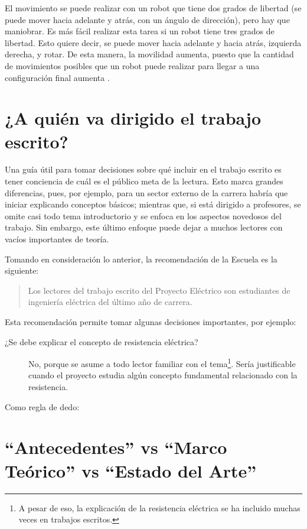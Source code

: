 El movimiento se puede realizar con un robot que tiene dos grados de libertad (se puede mover hacia adelante y atrás, con un ángulo de dirección), pero hay que maniobrar. Es más fácil realizar esta tarea si un robot tiene tres grados de libertad. Esto quiere decir, se puede mover hacia adelante y hacia atrás, izquierda derecha, y rotar. De esta manera, la movilidad aumenta, puesto que la cantidad de movimientos posibles que un robot puede realizar para llegar a una configuración final aumenta \cite{Batlle2009}. 


\section{¿A quién va dirigido el trabajo escrito?}
  
Una guía útil para tomar decisiones sobre qué incluir en el trabajo escrito es tener conciencia de cuál es el público meta de la lectura. Esto marca grandes diferencias, pues, por ejemplo, para un sector externo de la carrera habría que iniciar explicando conceptos básicos; mientras que, si está dirigido a profesores, se omite casi todo tema introductorio y se enfoca en los aspectos novedosos del trabajo. Sin embargo, este último enfoque puede dejar a muchos lectores con vacíos importantes de teoría.

Tomando en consideración lo anterior, la recomendación de la Escuela es la siguiente:

\begin{quote}
Los lectores del trabajo escrito del Proyecto Eléctrico son estudiantes de ingeniería eléctrica del último año de carrera.
\end{quote}

Esta recomendación permite tomar algunas decisiones importantes, por ejemplo:

\begin{description}
\item[¿Se debe explicar el concepto de resistencia eléctrica?] No, porque se asume a todo lector familiar con el tema\footnote{A pesar de eso, la explicación de la resistencia eléctrica se ha incluido muchas veces en trabajos escritos.}. Sería justificable cuando el proyecto estudia algún concepto fundamental relacionado con la resistencia.
\end{description}

Como regla de dedo:

\section{``Antecedentes'' vs ``Marco Teórico'' vs ``Estado del Arte''}

